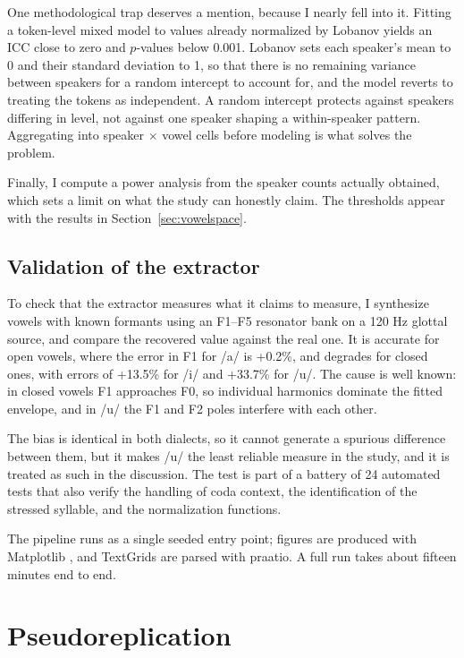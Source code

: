 \documentclass[11pt]{article}
\begin{document}
One methodological trap deserves a mention, because I nearly fell into it.
Fitting a token-level mixed model to values already normalized by Lobanov yields
an ICC close to zero and $p$-values below 0.001. Lobanov sets each
speaker's mean to 0 and their standard deviation to 1, so that there is no
remaining variance between speakers for a random intercept to account for, and
the model reverts to treating the tokens as independent. A random intercept
protects against speakers differing in level, not against one speaker shaping a
within-speaker pattern. Aggregating into speaker $\times$ vowel cells before
modeling is what solves the problem.

Finally, I compute a power analysis from the speaker counts actually obtained,
which sets a limit on what the study can honestly claim. The thresholds appear
with the results in Section~\ref{sec:vowelspace}.

\subsection{Validation of the extractor}

To check that the extractor measures what it claims to measure, I synthesize
vowels with known formants using an F1--F5 resonator bank on a 120 Hz glottal
source, and compare the recovered value against the real one. It is accurate for
open vowels, where the error in F1 for /a/ is +0.2\%, and degrades for closed
ones, with errors of +13.5\% for /i/ and +33.7\% for /u/. The cause is well
known: in closed vowels F1 approaches F0, so individual harmonics dominate the
fitted envelope, and in /u/ the F1 and F2 poles interfere with each other.

The bias is identical in both dialects, so it cannot generate a spurious
difference between them, but it makes /u/ the least reliable measure in the
study, and it is treated as such in the discussion. The test is part of a battery
of 24 automated tests that also verify the handling of coda context, the
identification of the stressed syllable, and the normalization functions.

The pipeline runs as a single seeded entry point; figures are produced with
Matplotlib \citep{hunter2007}, and TextGrids are parsed with praatio. A full run
takes about fifteen minutes end to end.

\section{Pseudoreplication}
\label{sec:pseudo}
\end{document}
